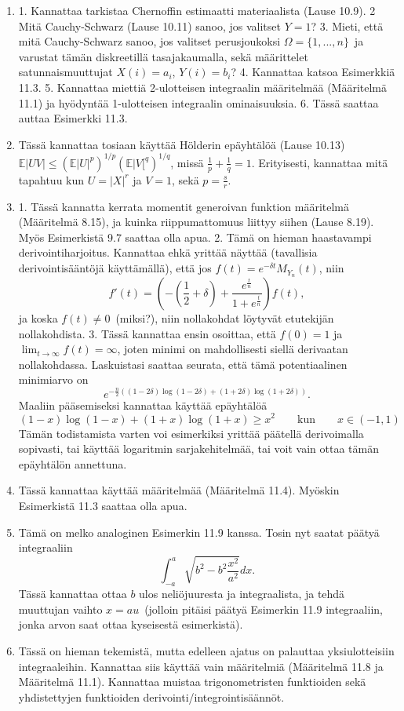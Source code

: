 \documentclass[11pt,a4paper]{amsart}
\newcommand{\E}{\mathbb{E}}
\newcommand{\1}{\mathbf{1}}
\begin{document}
\begin{Solution}
\begin{enumerate}
\item 1. Kannattaa tarkistaa Chernoffin estimaatti materiaalista (Lause 10.9). 2 Mitä Cauchy-Schwarz (Lause 10.11) sanoo, jos valitset $Y=1$? 3. Mieti, että mitä Cauchy-Schwarz sanoo, jos valitset perusjoukoksi $\Omega=\{1,...,n\}$ ja varustat tämän diskreetillä tasajakaumalla, sekä määrittelet satunnaismuuttujat $X(i)=a_i$, $Y(i)=b_i$? 4. Kannattaa katsoa Esimerkkiä 11.3. 5. Kannattaa miettiä 2-ulotteisen integraalin määritelmää  (Määritelmä 11.1) ja hyödyntää 1-ulotteisen integraalin ominaisuuksia. 6. Tässä saattaa auttaa Esimerkki 11.3.
\item Tässä kannattaa tosiaan käyttää Hölderin epäyhtälöä (Lause 10.13) $\E|UV|\leq (\E |U|^p)^{1/p} (\E |V[^q)^{1/q}$, missä $\frac{1}{p}+\frac{1}{q}=1$. Erityisesti, kannattaa mitä tapahtuu kun $U=|X|^r$ ja $V=1$, sekä $p=\frac{s}{r}$.
\item 1. Tässä kannatta kerrata momentit generoivan funktion määritelmä (Määritelmä 8.15), ja kuinka riippumattomuus liittyy siihen (Lause 8.19). Myös Esimerkistä 9.7 saattaa olla apua.  2. Tämä on hieman haastavampi derivointiharjoitus. Kannattaa ehkä yrittää näyttää (tavallisia derivointisääntöjä käyttämällä), että jos $f(t)=e^{-\delta t}M_{Y_n}(t)$, niin 
\[
f'(t)=\left(-\left(\frac{1}{2}+\delta\right)+\frac{e^{\frac{t}{n}}}{1+e^{\frac{t}{n}}} \right)f(t),
\]
ja koska $f(t)\neq 0$ (miksi?), niin nollakohdat löytyvät etutekijän nollakohdista. 3. Tässä kannattaa ensin osoittaa, että $f(0)=1$ ja $\lim_{t\to\infty}f(t)=\infty$, joten minimi on mahdollisesti siellä derivaatan nollakohdassa. Laskuistasi saattaa seurata, että tämä potentiaalinen minimiarvo on
\[
e^{-\frac{n}{2}((1-2\delta)\log(1-2\delta)+(1+2\delta)\log(1+2\delta))}.
\]
Maaliin pääsemiseksi kannattaa käyttää epäyhtälöä
\[
(1-x)\log(1-x)+(1+x)\log (1+x)\geq x^2 \qquad \text{kun} \qquad x\in (-1,1)
\]
Tämän todistamista varten voi esimerkiksi yrittää päätellä derivoimalla sopivasti, tai käyttää logaritmin sarjakehitelmää, tai voit vain ottaa tämän epäyhtälön annettuna.  
\item Tässä kannattaa käyttää määritelmää (Määritelmä 11.4). Myöskin Esimerkistä 11.3 saattaa olla apua. 
\item Tämä on melko analoginen Esimerkin 11.9 kanssa. Tosin nyt saatat päätyä integraaliin 
\[
\int_{-a}^a\sqrt{b^2-b^2\frac{x^2}{a^2}}dx.
\]
Tässä kannattaa ottaa $b$ ulos neliöjuuresta ja integraalista, ja tehdä muuttujan vaihto $x=au$ (jolloin pitäisi päätyä Esimerkin 11.9 integraaliin, jonka arvon saat ottaa kyseisestä esimerkistä).
\item Tässä on hieman tekemistä, mutta edelleen ajatus on palauttaa yksiulotteisiin integraaleihin. Kannattaa siis käyttää vain määritelmiä (Määritelmä 11.8 ja Määritelmä 11.1). Kannattaa muistaa trigonometristen funktioiden sekä yhdistettyjen funktioiden derivointi/integrointisäännöt.
\end{enumerate}
\end{Solution}
\end{document}
